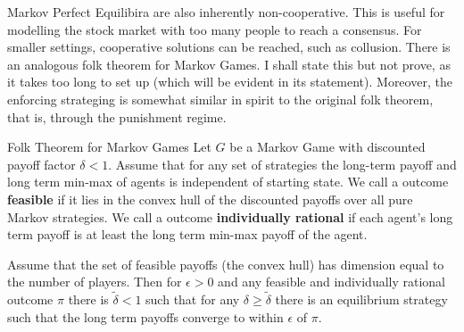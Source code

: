 Markov Perfect Equilibira are also inherently non-cooperative. This is useful for modelling the stock market with too many people to reach a consensus. For smaller settings, cooperative solutions can be reached, such as collusion. There is an analogous folk theorem for Markov Games. I shall state this but not prove, as it takes too long to set up (which will be evident in its statement). Moreover, the enforcing strateging is somewhat similar in spirit to the original folk theorem, that is, through the punishment regime. \begin{atheorem}{Folk Theorem for Markov Games \cite{Dutta1995}}{}
    Let $G$ be a Markov Game with discounted payoff factor $\delta<1$. Assume that for any set of strategies the long-term payoff and long term min-max of agents is independent of starting state.
    We call a outcome \textbf{feasible} if it lies in the convex hull of the discounted payoffs over all pure Markov strategies. We call a outcome \textbf{individually rational} if each agent's long term payoff is at least the long term min-max payoff of the agent. 
    
    Assume that the set of feasible payoffs (the convex hull) has dimension equal to the number of players. Then for $\epsilon>0$ and any feasible and individually rational outcome $\pi$ there is $\tilde{\delta}<1$ such that for any $\delta\geq \tilde{\delta}$ there is an equilibrium strategy such that the long term payoffs converge to within $\epsilon$ of $\pi$.
\end{atheorem}
